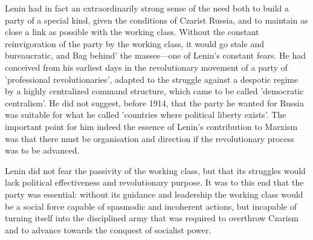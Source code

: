 Lenin had in fact an extraordinarily strong sense of the need both to build a party of a special kind, given the conditions of Czarist Russia, and to maintain as close a link as possible with the working class. Without the constant reinvigoration of the party by the working class, it would go stale and bureaucratic, and Bag behind' the masses—one of Lenin's constant fears. He had conceived from his earliest days in the revolutionary movement of a party of 'professional revolutionaries', adapted to the struggle against a despotic regime by a highly centralized command structure, which came to be called 'democratic centralism'. He did not suggest, before 1914, that the party he wanted for Russia was suitable for what he called 'countries where political liberty exists'. The important point for him indeed the essence of Lenin's contribution to Marxism was that there must be organisation and direction if the revolutionary process was to be advanced.

Lenin did not fear the passivity of the working class, but that its struggles would lack political effectiveness and revolutionary purpose. It was to this end that the party was essential: without its guidance and leadership the working class would be a social force capable of spasmodic and incoherent actions, but incapable of turning itself into the disciplined army that was required to overthrow Czarism and to advance towards the conquest of socialist power.

